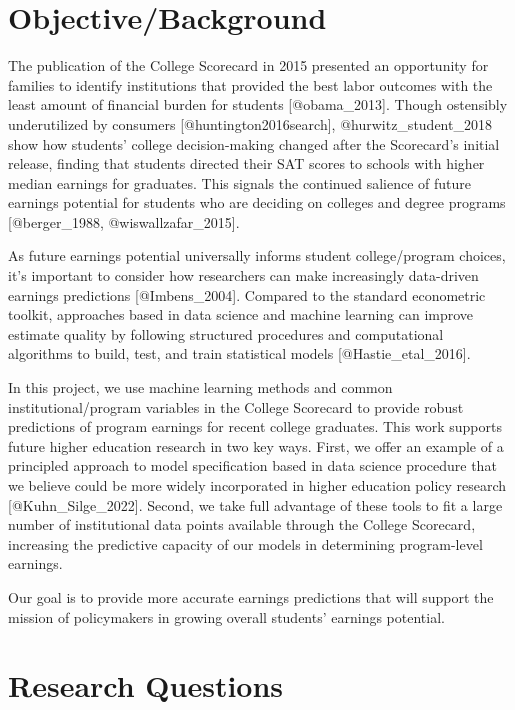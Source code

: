 \thispagestyle{empty}
\newpage

\hypertarget{objectivebackground}{%
\section{Objective/Background}\label{objectivebackground}}

The publication of the College Scorecard in 2015 presented an
opportunity for families to identify institutions that provided the best
labor outcomes with the least amount of financial burden for students
{[}@obama\_2013{]}. Though ostensibly underutilized by consumers
{[}@huntington2016search{]}, @hurwitz\_student\_2018 show how students'
college decision-making changed after the Scorecard's initial release,
finding that students directed their SAT scores to schools with higher
median earnings for graduates. This signals the continued salience of
future earnings potential for students who are deciding on colleges and
degree programs {[}@berger\_1988, @wiswallzafar\_2015{]}.

As future earnings potential universally informs student college/program
choices, it's important to consider how researchers can make
increasingly data-driven earnings predictions {[}@Imbens\_2004{]}.
Compared to the standard econometric toolkit, approaches based in data
science and machine learning can improve estimate quality by following
structured procedures and computational algorithms to build, test, and
train statistical models {[}@Hastie\_etal\_2016{]}.

In this project, we use machine learning methods and common
institutional/program variables in the College Scorecard to provide
robust predictions of program earnings for recent college graduates.
This work supports future higher education research in two key ways.
First, we offer an example of a principled approach to model
specification based in data science procedure that we believe could be
more widely incorporated in higher education policy research
{[}@Kuhn\_Silge\_2022{]}. Second, we take full advantage of these tools
to fit a large number of institutional data points available through the
College Scorecard, increasing the predictive capacity of our models in
determining program-level earnings.

Our goal is to provide more accurate earnings predictions that will
support the mission of policymakers in growing overall students'
earnings potential.

\hypertarget{research-questions}{%
\section{Research Questions}\label{research-questions}}

